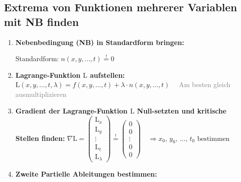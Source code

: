 \subsection{Extrema von Funktionen mehrerer Variablen mit NB finden}

\begin{enumerate}[itemsep=1ex]
    \item \textbf{Nebenbedingung (NB) in Standardform bringen:}\\
    \begin{minipage}[t]{0.4\columnwidth}
        Standardform: $n(x, y, ... , t) \stackrel{!}{=} 0$
    \end{minipage}\hfill
    \begin{minipage}[t]{0.6\columnwidth}
    \end{minipage}


    \item \textbf{Lagrange-Funktion $\mathrm{L}$ aufstellen:}\\
    $\mathrm{L}(x, y, ..., t, \lambda) =
    f(x, y, ..., t) + \lambda \cdot n(x, y, ..., t) \,\,\,\,\,\,$ \textcolor{gray}{Am besten gleich ausmultiplizieren}
    

    \item \textbf{Gradient der Lagrange-Funktion $\mathrm{L}$ Null-setzten und kritische Stellen finden:}
    $\nabla \mathrm{L}=
    \begin{pmatrix}
        \mathrm{L}_x\\
        \mathrm{L}_y\\
        \vdots \\
        \mathrm{L}_t\\
        \mathrm{L}_\lambda
    \end{pmatrix} \stackrel{!}{=}
    \begin{pmatrix}
        0\\
        0\\
        \vdots \\
        0\\
        0
    \end{pmatrix}
    \, \, \, \, \, \,
    \Rightarrow 
    x_0 \text{, } y_0 \text{, }... \text{, } t_0 \text{ bestimmen}$
    \hfill

    \item \textbf{Zweite Partielle Ableitungen bestimmen:}
    


\end{enumerate}
